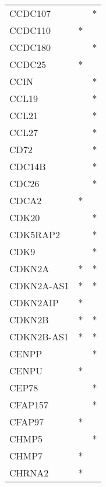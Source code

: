 \begin{longtable}{lcc}
CCDC107               &                &          * \\
CCDC110               &              * &            \\
CCDC180               &                &          * \\
CCDC25                &              * &            \\
CCIN                  &                &          * \\
CCL19                 &                &          * \\
CCL21                 &                &          * \\
CCL27                 &                &          * \\
CD72                  &                &          * \\
CDC14B                &                &          * \\
CDC26                 &                &          * \\
CDCA2                 &              * &            \\
CDK20                 &                &          * \\
CDK5RAP2              &                &          * \\
CDK9                  &                &          * \\
CDKN2A                &              * &          * \\
CDKN2A-AS1            &              * &          * \\
CDKN2AIP              &              * &            \\
CDKN2B                &              * &          * \\
CDKN2B-AS1            &              * &          * \\
CENPP                 &                &          * \\
CENPU                 &              * &            \\
CEP78                 &                &          * \\
CFAP157               &                &          * \\
CFAP97                &              * &            \\
CHMP5                 &                &          * \\
CHMP7                 &              * &            \\
CHRNA2                &              * &            \\

\end{longtable}
